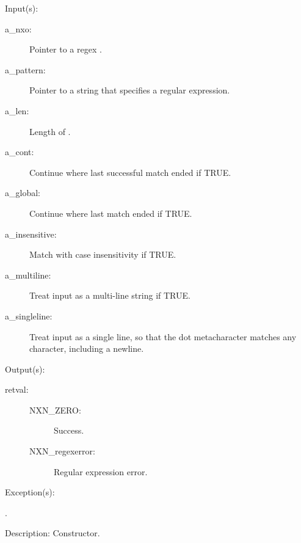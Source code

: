 \begin{capi}
\label{nxo_regex_new}
	\begin{capilist}
	\item[Input(s): ]
		\begin{description}\item[]
		\item[a\_nxo: ]
			Pointer to a regex .
		\item[a\_pattern: ]
			Pointer to a string that specifies a regular expression.
		\item[a\_len: ]
			Length of .
		\item[a\_cont: ]
			Continue where last successful match ended if TRUE.
		\item[a\_global: ]
			Continue where last match ended if TRUE.
		\item[a\_insensitive: ]
			Match with case insensitivity if TRUE.
		\item[a\_multiline: ]
			Treat input as a multi-line string if TRUE.
		\item[a\_singleline: ]
			Treat input as a single line, so that the dot
			metacharacter matches any character, including a
			newline.
		\end{description}
	\item[Output(s): ]
		\begin{description}\item[]
		\item[retval: ]
			\begin{description}\item[]
			\item[NXN\_ZERO: ] Success.
			\item[NXN\_regexerror: ] Regular expression error.
			\end{description}
		\end{description}
	\item[Exception(s): ]
		\begin{description}\item[]
		\item[.]
		\end{description}
	\item[Description: ]
		Constructor.
	\end{capilist}

\end{capi}
